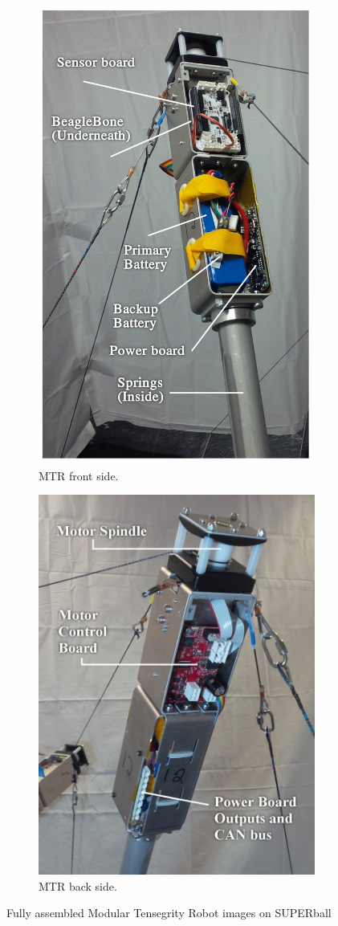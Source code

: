 \begin{figure}[thpb]
\begin{subfigure}{.5\textwidth}
      \centering
      \includegraphics[width=0.5\columnwidth]{tex/img/endcap_upclose_sensorboard_labelled_fixedfonts}
      \caption{MTR front side.}
      \label{fig:endcap_upclose_front}
\end{subfigure}
\begin{subfigure}{.5\textwidth}
      \centering
      \includegraphics[width=0.5\columnwidth]{tex/img/endcap_upclose_motorboard_labelled_fixedfonts}
      \caption{MTR back side.}
      \label{fig:endcap_upclose_back}
\end{subfigure}
\caption{Fully assembled Modular Tensegrity Robot images on SUPERball}
\label{fig:fully_assembled_endcap}
\end{figure}


